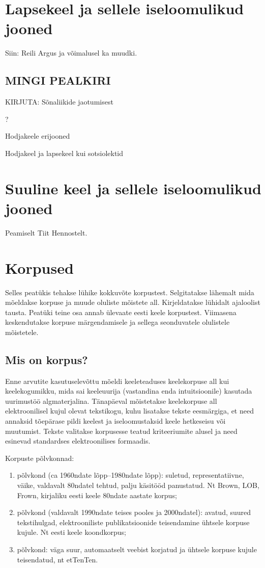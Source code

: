 \documentclass[12pt]{article}
\begin{document}
\newpage
\section{Lapsekeel ja sellele iseloomulikud jooned}
Siin: Reili Argus ja võimalusel ka muudki.


\subsection{MINGI PEALKIRI}



KIRJUTA:
Sõnaliikide jaotumisest

?

Hodjakeele erijooned

Hodjakeel ja lapsekeel kui sotsiolektid




\newpage
\section{Suuline keel ja sellele iseloomulikud jooned}
Peamiselt Tiit Hennostelt.

\newpage
\section{Korpused}
Selles peatükis tehakse lühike kokkuvõte korpustest. Selgitatakse lähemalt mida mõeldakse korpuse ja muude
oluliste mõistete all. Kirjeldatakse lühidalt ajaloolist tausta. Peatüki teine osa annab ülevaate eesti keele korpustest. Viimasena keskendutakse korpuse märgendamisele ja sellega seonduvatele olulistele mõistetele.

\subsection{Mis on korpus?}
Enne arvutite kasutuselevõttu mõeldi keeleteaduses keelekorpuse all kui keelekogumikku, mida sai
keeleuurija (vastandina enda intuitsioonile) kasutada uurimustöö algmaterjalina. Tänapäeval mõistetakse
keelekorpuse all elektroonilisel kujul olevat tekstikogu, kuhu lisatakse tekste eesmärgiga, et need annaksid
tõepärase pildi keelest ja iseloomustaksid keele hetkeseisu või muutumist. Tekste valitakse korpusesse teatud kriteeriumite alusel ja need esinevad standardses elektroonilises formaadis. \citep[9]{KR}

Korpuste põlvkonnad:
\begin{enumerate}
\item põlvkond (ca 1960ndate lõpp--1980ndate lõpp): suletud, representatiivne, väike, valdavalt 80ndatel
tehtud, palju käsitööd panustatud. Nt Brown, LOB, Frown, kirjaliku eesti keele 80ndate aastate korpus;
\item põlvkond (valdavalt 1990ndate teises pooles ja 2000ndatel): avatud, suured tekstihulgad,
elektrooniliste publikatsioonide teisendamine ühtsele korpuse kujule. Nt eesti keele koondkorpus;
\item põlvkond: väga suur, automaatselt veebist korjatud ja ühtsele korpuse kujule teisendatud, nt etTenTen.
\citep{KT}
\end{enumerate}
\end{document}
